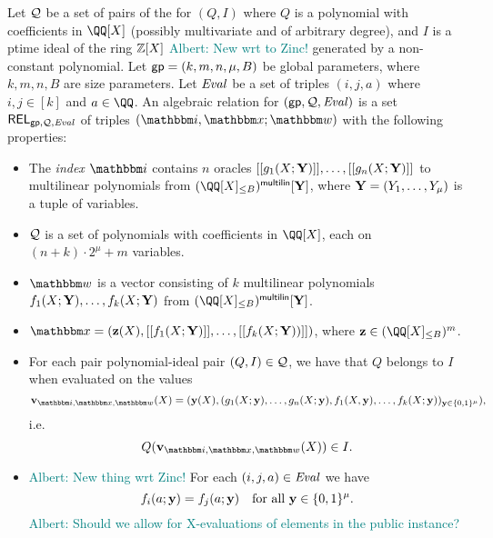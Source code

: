 \documentclass[11pt,letterpaper,usenames,dvipsnames]{article}
\newcommand{\albert}[1]{\textcolor{teal}{Albert: {#1}}}
\begin{document}
Let $\mathcal{Q}$ be a set of pairs of the for $(Q, I)$ where $Q$ is a polynomial with coefficients in $\QQ[X]$ (possibly multivariate and of arbitrary degree), and $I$ is a ptime ideal of the ring $\mathbb{Z}[X]$ \albert{New wrt to Zinc!} generated by a non-constant polynomial. Let $\mathsf{gp} = (k, m, n, \mu, B)$ be global parameters, where $k,m,n,B$ are size parameters. Let $\text{\emph{Eval}}$ be a set of triples $(i, j, a)$ where $i,j\in [k]$ and $a \in \QQ$. An algebraic relation for $(\mathsf{gp},\mathcal{Q}, \text{\emph{Eval}})$ is a set $\mathsf{REL}_{\mathsf{gp}, \mathcal{Q}, \text{\emph{Eval}}}$ of triples $(\idx, \inp;\wit)$ with the following properties:
\begin{itemize}
	\item The \emph{index} $\idx$ contains $n$ oracles $[[{g_1(X;\mathbf{Y})}]], \ldots, [[{g_n(X;\mathbf{Y})}]]$ to multilinear polynomials from $\mainQpolyring^\multilin[\YY]$, where $\mathbf{Y}=(Y_1,\ldots, Y_\mu) $ is a tuple of variables.
	 \item $\mathcal{Q}$ is a set of polynomials with coefficients in $\QQ[X]$, each on $(n+ k)\cdot 2^\mu + m$ variables.
	\item $\wit$ is a vector consisting of $k$ multilinear polynomials $f_1(X;\mathbf{Y}),\ldots, f_k(X;\mathbf{Y})$ from $\mainQpolyring^{\multilin}[\YY]$. %
	\item $\inp=(\zz(X), \oracle{f_1(X;\YY)}, \ldots, \oracle{f_k(X;\YY))})$, where $\zz\in \mainQpolyring^m$.
	\item For each pair polynomial-ideal pair $(Q,I)\in \mathcal{Q}$, we have that $Q$ belongs to $I$  when evaluated on the values $$\vv_{\idx, \inp,\wit}(X)=(\yy(X), (g_1(X;\yy),\ldots, g_n(X;\yy), f_1(X,\yy),\ldots, f_k(X;\yy))_{\yy\in \BB^\mu}),$$
    i.e.
    $$
    Q(\vv_{\idx, \inp,\wit}(X)) \in I.
    $$
    \item \albert{New thing wrt Zinc!} For each $(i,j,a)\in \text{\emph{Eval}}$ we have
    $$
    f_i(a; \mathbf{y}) = f_j(a;\mathbf{y}) \quad \text{for all } \mathbf{y}\in \{0,1\}^\mu.
    $$
    \albert{Should we allow for X-evaluations of elements in the public instance?}
	\end{itemize}
\end{document}
